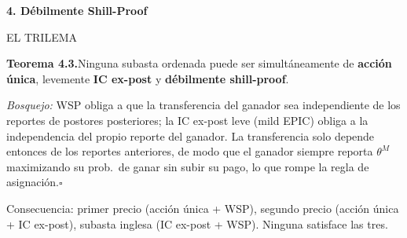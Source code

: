 \documentclass[20pt]{extarticle}
\renewcommand{\normalsize}{\fontsize{24}{30}\selectfont}
\renewcommand{\small}{\fontsize{20}{25}\selectfont}
\renewcommand{\footnotesize}{\fontsize{18}{22}\selectfont}
\renewcommand{\Large}{\fontsize{32}{40}\selectfont}
\newcommand{\redd}[1]{\textcolor{colred}{\textbf{#1}}}
\newcommand{\mut}[1]{\textcolor{muted}{#1}}
\newcommand{\slbl}[1]{\par\noindent\begingroup\raggedright\fontsize{20}{24}\selectfont\color{muted}\MakeUppercase{#1}\par\endgroup\vspace{2mm}}
\newcommand{\stit}[1]{{\fontsize{38}{46}\selectfont\color{ink}\textbf{#1}}}
\begin{document}
\begin{minipage}[t]{35cm}


  \stit{4. Débilmente Shill-Proof}

  \slbl{El trilema}
  \begin{tcolorbox}[shaded]
    \footnotesize\textbf{Teorema 4.3.}\enspace Ninguna subasta ordenada puede ser simultáneamente de \textbf{acción única}, levemente \textbf{IC ex-post} y \textbf{débilmente shill-proof}.

    \smallskip\emph{Bosquejo:} WSP obliga a que la transferencia del ganador sea independiente de los reportes de postores posteriores; la IC ex-post leve (mild EPIC) obliga a la independencia del propio reporte del ganador. La transferencia solo depende entonces de los reportes anteriores, de modo que el ganador siempre reporta $\theta^M$ maximizando su prob.\ de ganar sin subir su pago, lo que rompe la regla de asignación.\hfill$\square$

    \smallskip\mut{Consecuencia: primer precio (acción única + WSP), segundo precio (acción única + IC ex-post), subasta inglesa (IC ex-post + WSP). Ninguna satisface las tres.}
  \end{tcolorbox}

  \vspace{6mm}

  \begin{center}
\end{center}
\end{minipage}
\end{document}
